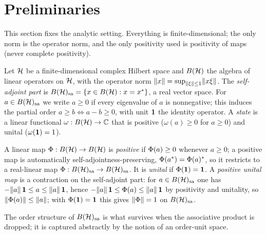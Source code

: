 \section{Preliminaries}\label{sec:prelim}

This section fixes the analytic setting. Everything is finite-dimensional; the
only norm is the operator norm, and the only positivity used is positivity of
maps (never complete positivity).

\begin{definition}\label{def:operators}
Let $\mathcal{H}$ be a finite-dimensional complex Hilbert space and $B(\mathcal{H})$ the algebra
of linear operators on $\mathcal{H}$, with the operator norm
$\lVert x \rVert=\sup_{\lVert \xi \rVert\le 1}\lVert x\xi \rVert$. The \emph{self-adjoint part} is
$B(\mathcal{H})_{\mathrm{sa}}=\{x\in B(\mathcal{H}):x=x^*\}$, a real vector space. For $a\in B(\mathcal{H})_{\mathrm{sa}}$ we write
$a\ge 0$ if every eigenvalue of $a$ is nonnegative; this induces the partial
order $a\ge b\iff a-b\ge 0$, with unit $\mathbf{1}$ the identity operator. A
\emph{state} is a linear functional $\omega:B(\mathcal{H})\to\mathbb{C}$ that is positive
($\omega(a)\ge 0$ for $a\ge 0$) and unital ($\omega(\mathbf{1})=1$).
\end{definition}

\begin{definition}\label{def:positive-map}
A linear map $\Phi:B(\mathcal{H})\to B(\mathcal{H})$ is \emph{positive} if $\Phi(a)\ge 0$
whenever $a\ge 0$; a positive map is automatically self-adjointness-preserving,
$\Phi(a^*)=\Phi(a)^*$, so it restricts to a real-linear map
$\Phi:B(\mathcal{H})_{\mathrm{sa}}\to B(\mathcal{H})_{\mathrm{sa}}$. It is \emph{unital} if $\Phi(\mathbf{1})=\mathbf{1}$. A
\emph{positive unital map} is a contraction on the self-adjoint part: for
$a\in B(\mathcal{H})_{\mathrm{sa}}$ one has $-\lVert a \rVert\,\mathbf{1}\le a\le\lVert a \rVert\,\mathbf{1}$, hence
$-\lVert a \rVert\,\mathbf{1}\le\Phi(a)\le\lVert a \rVert\,\mathbf{1}$ by positivity and unitality, so
$\lVert \Phi(a) \rVert\le\lVert a \rVert$; with $\Phi(\mathbf{1})=\mathbf{1}$ this gives
$\lVert \Phi \rVert=1$ on $B(\mathcal{H})_{\mathrm{sa}}$.
\end{definition}

The order structure of $B(\mathcal{H})_{\mathrm{sa}}$ is what survives when the associative product is
dropped; it is captured abstractly by the notion of an order-unit space.

